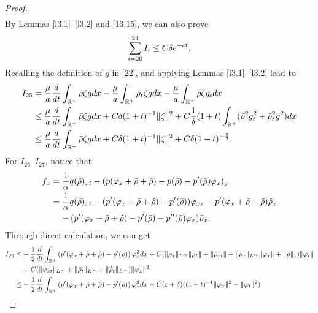 \documentclass[10pt,a4paper]{amsart}
\begin{document}
\begin{proof}
\begin{align}
		\end{align}
		By Lemmas \ref{l3.1}--\ref{l3.2} and \eqref{13.15}, we can also prove
		\begin{align}
			\sum_{i=20}^{24}I_i\leq C\delta{\rm e}^{-ct}.
		\end{align}
		Recalling
		the definition of $g$ in \eqref{22}, and applying Lemmas \ref{l3.1}--\ref{l3.2} lead to
		\begin{align}\label{K15}
			I_{25}
			&=\frac{\mu}{a}\frac{{\rm d}}{{\rm d}t}\int_{\mathbb{R}^+}\bar\rho\zeta g{\rm d}x-\frac{\mu}{a}\int_{\mathbb{R}^+}\bar\rho_t\zeta g{\rm d}x-\frac{\mu}{a}\int_{\mathbb{R}^+}\bar\rho\zeta g_t{\rm d}x\notag\\
			&\leq \frac{\mu}{a}\frac{{\rm d}}{{\rm d}t}\int_{\mathbb{R}^+}\bar\rho\zeta g{\rm d}x+C\delta(1+t)^{-1}\|\zeta\|^2
			+C\frac{1}{\delta}(1+t)\int_{\mathbb{R}^+}(\bar\rho^2g_t^2+\bar\rho_t^2g^2){\rm d}x\notag\\
			&\leq \frac{\mu}{a}\frac{{\rm d}}{{\rm d}t}\int_{\mathbb{R}^+}\bar\rho\zeta g{\rm d}x+C\delta(1+t)^{-1}\|\zeta\|^2+C\delta(1+t)^{-\frac{5}{2}}.
		\end{align}
	For $I_{26}$--$I_{27}$, notice that
		\begin{align}\label{fx}
			f_x&=\frac{1}{\alpha}q(\bar\rho)_{xt}-\left(p(\varphi_x+\bar\rho+\hat\rho)-p(\bar\rho)-p^{\prime}(\bar\rho)\varphi_x\right)_x\notag\\
			&=\frac{1}{\alpha}q(\bar\rho)_{xt}-(p^{\prime}(\varphi_x+\bar\rho+\hat\rho)-p^{\prime}(\bar\rho))\varphi_{xx}-p^{\prime}(\varphi_x+\bar\rho+\hat\rho)\hat\rho_x\notag\\
			&\;\;\;\;-(p^{\prime}(\varphi_x+\bar\rho+\hat\rho)-p^{\prime}(\bar\rho)-p^{\prime\prime}(\bar\rho)\varphi_x)\bar\rho_x.
		\end{align}
	Through direct calculation, we can get
		\begin{align}\label{J16}
			I_{26}\leq& -\frac{1}{2}	\frac{{\rm d}}{{\rm d}t}\int_{\mathbb{R}^+}\left(p^{\prime}(\varphi_x+\bar\rho+\hat\rho)-p^{\prime}(\bar\rho)\right)\varphi_x^2{\rm d}x+C(\|\bar\rho_x\|_{L^\infty}\|\bar\rho_t\|+\|\bar\rho_{xt}\|+\|\bar\rho_x\|_{L^\infty}\|\varphi_x\|+\|\hat\rho\|_1)\|\varphi_t\|\notag\\
			&+C(\|\varphi_{xt}\|_{L^\infty}+\|\bar\rho_t\|_{L^\infty}+\|\hat\rho_t\|_{L^\infty})\|\varphi_x\|^2\notag\\ 
			\leq&-\frac{1}{2}	\frac{{\rm d}}{{\rm d}t}\int_{\mathbb{R}^+}\left(p^{\prime}(\varphi_x+\bar\rho+\hat\rho)-p^{\prime}(\bar\rho)\right)\varphi_x^2{\rm d}x+C(\varepsilon+\delta)((1+t)^{-1}\|\varphi_x\|^2+\|\varphi_t\|^2)\notag\\ 

\end{align}
\end{proof}
\end{document}
